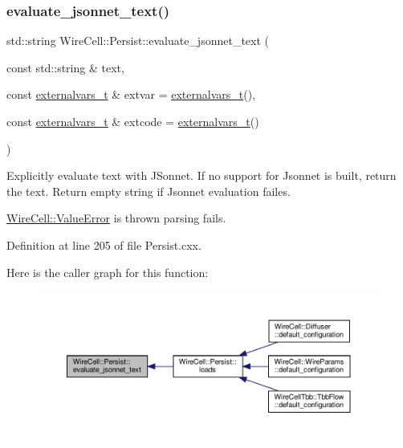 \subsubsection{\texorpdfstring{evaluate\+\_\+jsonnet\+\_\+text()}{evaluate\_jsonnet\_text()}}
{\footnotesize\ttfamily std\+::string Wire\+Cell\+::\+Persist\+::evaluate\+\_\+jsonnet\+\_\+text (\begin{DoxyParamCaption}\item[{const std\+::string \&}]{text,  }\item[{const \hyperlink{namespace_wire_cell_1_1_persist_ae031fc57de5b5814ccd700d007bc847b}{externalvars\+\_\+t} \&}]{extvar = {\ttfamily \hyperlink{namespace_wire_cell_1_1_persist_ae031fc57de5b5814ccd700d007bc847b}{externalvars\+\_\+t}()},  }\item[{const \hyperlink{namespace_wire_cell_1_1_persist_ae031fc57de5b5814ccd700d007bc847b}{externalvars\+\_\+t} \&}]{extcode = {\ttfamily \hyperlink{namespace_wire_cell_1_1_persist_ae031fc57de5b5814ccd700d007bc847b}{externalvars\+\_\+t}()} }\end{DoxyParamCaption})}

Explicitly evaluate text with J\+Sonnet. If no support for Jsonnet is built, return the text. Return empty string if Jsonnet evaluation failes.

\hyperlink{struct_wire_cell_1_1_value_error}{Wire\+Cell\+::\+Value\+Error} is thrown parsing fails. 

Definition at line 205 of file Persist.\+cxx.

Here is the caller graph for this function\+:
\nopagebreak
\begin{figure}[H]
\begin{center}
\leavevmode
\includegraphics[width=350pt]{namespace_wire_cell_1_1_persist_ab593a212dbed0b2185fe5fe70b29fc68_icgraph}
\end{center}
\end{figure}
\mbox{\label{namespace_wire_cell_1_1_persist_a3b9a35a2580c04da89629682d43eae40}} 
